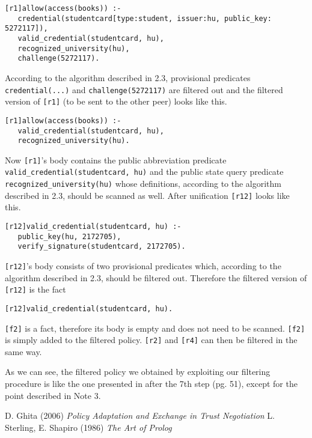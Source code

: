 \documentclass{article}
\begin{document}
\begin{description}
\begin{verbatim}[r1]allow(access(books)) :-
   credential(studentcard[type:student, issuer:hu, public_key: 5272117]),
   valid_credential(studentcard, hu),
   recognized_university(hu),
   challenge(5272117).
\end{verbatim}

According to the algorithm described in 2.3, provisional predicates \texttt{credential(...)} and \texttt{challenge(5272117)} are filtered out and the filtered version of \texttt{[r1]} (to be sent to the other peer) looks like this.

\begin{verbatim}[r1]allow(access(books)) :-
   valid_credential(studentcard, hu),
   recognized_university(hu).
\end{verbatim}

Now \texttt{[r1]}'s body contains the public abbreviation predicate \texttt{valid\_credential(studentcard, hu)} and the public state query predicate \texttt{recognized\_university(hu)} whose definitions, according to the algorithm described in 2.3, should be scanned as well. After unification \texttt{[r12]} looks like this.

\begin{verbatim}[r12]valid_credential(studentcard, hu) :-
   public_key(hu, 2172705),
   verify_signature(studentcard, 2172705).
\end{verbatim}

\texttt{[r12]}'s body consists of two provisional predicates which, according to the algorithm described in 2.3, should be filtered out. Therefore the filtered version of \texttt{[r12]} is the fact

\begin{verbatim}[r12]valid_credential(studentcard, hu).
\end{verbatim}

\texttt{[f2]} is a fact, therefore its body is empty and does not need to be scanned. \texttt{[f2]} is simply added to the filtered policy.
\texttt{[r2]} and \texttt{[r4]} can then be filtered in the same way.
\end{description}

As we can see, the filtered policy we obtained by exploiting our filtering procedure is like the one presented in \cite{Denisa} after the 7th step (pg. 51), except for the point described in Note 3.

\begin{thebibliography}{99}
 D. Ghita (2006) \textit{Policy Adaptation and Exchange in Trust Negotiation}
 L. Sterling, E. Shapiro (1986) \textit{The Art of Prolog}
\end{thebibliography}
\end{document}
